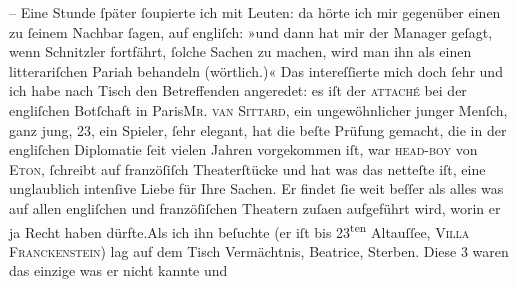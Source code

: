 \begin{ledgroupsized}[t]{13cm}
           \pstart
           \numberlinefalse{}\centering{}–\numberlinetrue{}\pend
           \pstart
           \noindent{}Eine Stunde ſpäter ſoupierte ich mit Leuten: da hörte ich mir gegenüber einen  zu ſeinem Nachbar ſagen, auf engliſch: »und dann
               hat mir der Manager geſagt, wenn Schnitzler fortfährt, {\pb}ſolche Sachen zu machen, wird man
               ihn als einen litterariſchen Pariah behandeln (wörtlich.)« Das intereſſierte mich
               doch ſehr und ich habe nach Tisch den Betreffenden angeredet: es iſt der \textsc{attaché} bei der engliſchen
                  Botſchaft in Paris\textsc{Mr.
                     van Sittard}, ein ungewöhnlicher junger
               Menſch, ganz jung, 23, ein Spieler, ſehr elegant, hat die beſte Prüfung gemacht, die
               in {\pb}der engliſchen Diplomatie ſeit
               vielen Jahren vorgekommen iſt, war \textsc{head-boy} von \textsc{Eton}, ſchreibt auf
               franzöſiſch Theaterſtücke und hat was das netteſte iſt, eine unglaublich intenſive
               Liebe für Ihre Sachen. Er findet ſie weit beſſer als alles was auf allen engliſchen
               und franzöſiſchen Theatern zuſa{\geminationm}en aufgeführt wird,
               worin er ja Recht haben dürfte.\hspace*{1.5em}Als ich ihn beſuchte
               (er {\pb}iſt bis 23\textsuperscript{ten}{ }Altauſſee, \textsc{Villa
                     Franckenſtein}) lag auf dem Tisch Vermächtnis, Beatrice, Sterben. Diese 3 waren das einzige was er nicht kannte und

\end{ledgroupsized}
